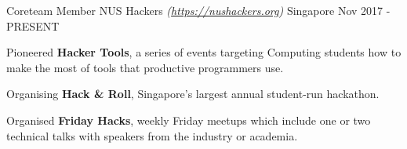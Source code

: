 

\begin{cventries}

  \cventry
  {Coreteam Member} %
  {NUS Hackers \textmd{\em\tiny(\url{https://nushackers.org})}} %
  {Singapore} %
  {Nov 2017 - PRESENT} %
  {
    \begin{cvitems} %
      \item {Pioneered \textbf{Hacker Tools}, a series of events targeting Computing students how to make the most of tools that productive programmers use.}
      \item {Organising \textbf{Hack \& Roll}, Singapore's largest annual student-run hackathon.}
      \item {Organised \textbf{Friday Hacks}, weekly Friday meetups which include one or two technical talks with speakers from the industry or academia.}
    \end{cvitems}
  }


\end{cventries}
